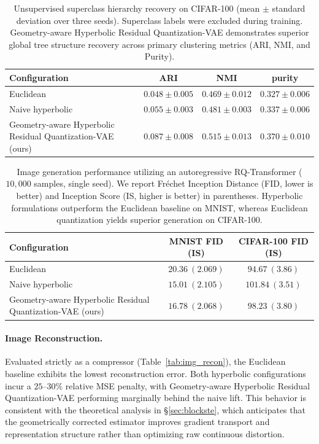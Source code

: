 \documentclass[12pt]{report}
\begin{document}
\begin{table}[h]
\centering
\caption{Unsupervised superclass hierarchy recovery on CIFAR-100 (mean $\pm$ standard deviation over three seeds). Superclass labels were excluded during training. Geometry-aware Hyperbolic Residual Quantization-VAE demonstrates superior global tree structure recovery across primary clustering metrics (ARI, NMI, and Purity).}
\label{tab:img_hier}
\begin{tabular}{lccc}
\hline
Configuration & ARI & NMI & purity \\
\hline
Euclidean & $0.048 \pm 0.005$ & $0.469 \pm 0.012$ & $0.327 \pm 0.006$ \\
Naive hyperbolic & $0.055 \pm 0.003$ & $0.481 \pm 0.003$ & $0.337 \pm 0.006$ \\
Geometry-aware Hyperbolic Residual Quantization-VAE (ours) & $\mathbf{0.087 \pm 0.008}$ & $\mathbf{0.515 \pm 0.013}$ & $\mathbf{0.370 \pm 0.010}$ \\
\hline
\end{tabular}
\end{table}

\begin{table}[h]
\centering
\caption{Image generation performance utilizing an autoregressive RQ-Transformer ($10{,}000$ samples, single seed). We report Fr\'echet Inception Distance (FID, lower is better) and Inception Score (IS, higher is better) in parentheses. Hyperbolic formulations outperform the Euclidean baseline on MNIST, whereas Euclidean quantization yields superior generation on CIFAR-100.}
\label{tab:img_gen}
\begin{tabular}{lcc}
\hline
Configuration & MNIST FID (IS) & CIFAR-100 FID (IS) \\
\hline
Euclidean & $20.36\ (2.069)$ & $\mathbf{94.67}\ (3.86)$ \\
Naive hyperbolic & $\mathbf{15.01}\ (2.105)$ & $101.84\ (3.51)$ \\
Geometry-aware Hyperbolic Residual Quantization-VAE (ours) & $16.78\ (2.068)$ & $98.23\ (3.80)$ \\
\hline
\end{tabular}
\end{table}

\paragraph{Image Reconstruction.}
Evaluated strictly as a compressor (Table~\ref{tab:img_recon}), the Euclidean baseline exhibits the lowest reconstruction error. Both hyperbolic configurations incur a $25$--$30\%$ relative MSE penalty, with Geometry-aware Hyperbolic Residual Quantization-VAE performing marginally behind the naive lift. This behavior is consistent with the theoretical analysis in \S\ref{sec:blockste}, which anticipates that the geometrically corrected estimator improves gradient transport and representation structure rather than optimizing raw continuous distortion.
\end{document}
